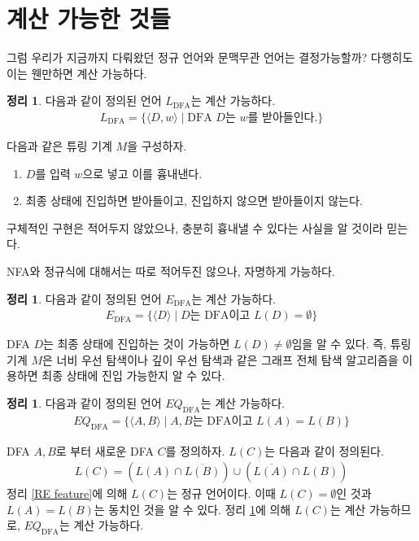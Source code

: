\documentclass[b5paper, 11pt]{book}
\theoremstyle{definition}
\newtheorem{thm}[defn]{정리}
\newenvironment{pf*}{\pushQED{\qed}\pf}
{\popQED\endpf}
\begin{document}
\section{계산 가능한 것들}
그럼 우리가 지금까지 다뤄왔던 정규 언어와 문맥무관 언어는 결정가능할까? 다행히도 이는 웬만하면 계산 가능하다.
\begin{thm}
    다음과 같이 정의된 언어 $L_{\text{DFA}}$는 계산 가능하다.
    \begin{align*}
        L_{\text{DFA}} = \{ \langle D, w \rangle \;\vert\; 
        \text{DFA } D \text{는 }w\text{를 받아들인다.}\}
    \end{align*}
\end{thm}
\begin{pf*}
    다음과 같은 튜링 기계 $M$을 구성하자.
    \begin{enumerate}
        \item $D$를 입력 $w$으로 넣고 이를 흉내낸다. 
        \item 최종 상태에 진입하면 받아들이고, 진입하지 않으면 받아들이지 않는다.
    \end{enumerate}
    구체적인 구현은 적어두지 않았으나, 충분히 흉내낼 수 있다는 사실을 알 것이라 믿는다.
\end{pf*}
NFA와 정규식에 대해서는 따로 적어두진 않으나, 자명하게 가능하다.
\begin{thm}
    \label{empty DFA}
    다음과 같이 정의된 언어 $E_{\text{DFA}}$는 계산 가능하다.
    \begin{align*}
        E_{\text{DFA}} = \{ \langle D \rangle \;\vert\; 
        D\text{는 DFA이고 } L(D) = \emptyset\}
    \end{align*}
\end{thm}
\begin{pf*}
    DFA $D$는 최종 상태에 진입하는 것이 가능하면 $L(D) \neq \emptyset$임을 알 수 있다. 즉, 튜링 기계 $M$은 너비 우선 탐색이나 깊이 우선 탐색과 같은 그래프 전체 탐색 알고리즘을 이용하면 최종 상태에 진입 가능한지 알 수 있다. 
\end{pf*}
\begin{thm}
    \label{DFA equiv decidable}
    다음과 같이 정의된 언어 $EQ_{\text{DFA}}$는 계산 가능하다.
    \begin{align*}
        EQ_{\text{DFA}} = \{ \langle A, B \rangle \;\vert\; 
        A, B\text{는 DFA이고 } L(A) = L(B)\}
    \end{align*}
\end{thm}
\begin{pf*}
    DFA $A, B$로 부터 새로운 DFA $C$를 정의하자. $L(C)$는 다음과 같이 정의된다.
    \begin{align*}
        L(C) = \left( L(A) \cap \overline{L(B)} \right) \cup
        \left( \overline{L(A)} \cap L(B)\right)
    \end{align*}
    정리 \ref{RE feature}에 의해 $L(C)$는 정규 언어이다. 이때 $L(C) = \emptyset$인 것과 $L(A) = L(B)$는 동치인 것을 알 수 있다. 정리 \ref{empty DFA}에 의해 $L(C)$는 계산 가능하므로, $EQ_{\text{DFA}}$는  계산 가능하다.
\end{pf*}
\end{document}
